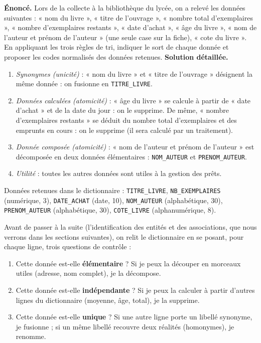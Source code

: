 \documentclass[11pt]{article}
\newcounter{popsec}
\newcounter{popsub}
\newcommand{\courssub}[1]{%
  \stepcounter{popsub}%
  \par\vspace{9pt}\noindent{\popxbold\fontsize{11.5}{13}\selectfont\color{popink}{\color{poporange}\thepopsec.\thepopsub}\hspace{6pt}#1}\par\nopagebreak\vspace{4pt}
}
\begin{document}
\begin{exoresolu}
\textbf{Énoncé.} Lors de la collecte à la bibliothèque du lycée, on a relevé les données suivantes : « nom du livre », « titre de l'ouvrage », « nombre total d'exemplaires », « nombre d'exemplaires restants », « date d'achat », « âge du livre », « nom de l'auteur et prénom de l'auteur » (une seule case sur la fiche), « cote du livre ». En appliquant les trois règles de tri, indiquer le sort de chaque donnée et proposer les codes normalisés des données retenues.
\tcblower
\textbf{Solution détaillée.}
\begin{enumerate}
  \item \emph{Synonymes (unicité)} : « nom du livre » et « titre de l'ouvrage » désignent la même donnée : on fusionne en \texttt{TITRE\_LIVRE}.
  \item \emph{Données calculées (atomicité)} : « âge du livre » se calcule à partir de « date d'achat » et de la date du jour : on le supprime. De même, « nombre d'exemplaires restants » se déduit du nombre total d'exemplaires et des emprunts en cours : on le supprime (il sera calculé par un traitement).
  \item \emph{Donnée composée (atomicité)} : « nom de l'auteur et prénom de l'auteur » est décomposée en deux données élémentaires : \texttt{NOM\_AUTEUR} et \texttt{PRENOM\_AUTEUR}.
  \item \emph{Utilité} : toutes les autres données sont utiles à la gestion des prêts.
\end{enumerate}
Données retenues dans le dictionnaire : \texttt{TITRE\_LIVRE}, \texttt{NB\_EXEMPLAIRES} (numérique, 3), \texttt{DATE\_ACHAT} (date, 10), \texttt{NOM\_AUTEUR} (alphabétique, 30), \texttt{PRENOM\_AUTEUR} (alphabétique, 30), \texttt{COTE\_LIVRE} (alphanumérique, 8).
\end{exoresolu}

\courssub{Vérification finale du dictionnaire}

Avant de passer à la suite (l'identification des entités et des associations, que nous verrons dans les sections suivantes), on relit le dictionnaire en se posant, pour chaque ligne, trois questions de contrôle :

\begin{enumerate}
  \item Cette donnée est-elle \textbf{élémentaire} ? Si je peux la découper en morceaux utiles (adresse, nom complet), je la décompose.
  \item Cette donnée est-elle \textbf{indépendante} ? Si je peux la calculer à partir d'autres lignes du dictionnaire (moyenne, âge, total), je la supprime.
  \item Cette donnée est-elle \textbf{unique} ? Si une autre ligne porte un libellé synonyme, je fusionne ; si un même libellé recouvre deux réalités (homonymes), je renomme.
\end{enumerate}
\end{document}

